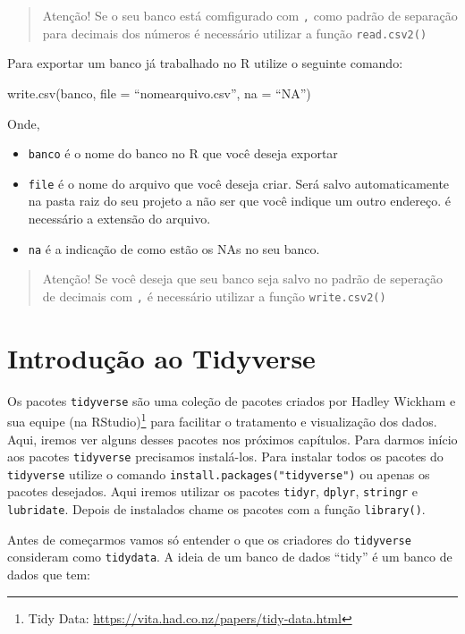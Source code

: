 \documentclass[]{book}
\providecommand{\tightlist}{%
  \setlength{\itemsep}{0pt}\setlength{\parskip}{0pt}}
\let\rmarkdownfootnote\footnote%
\def\footnote{\protect\rmarkdownfootnote}
\theoremstyle{definition}
\theoremstyle{definition}
\theoremstyle{definition}
\theoremstyle{remark}
\begin{document}
\begin{quote}
Atenção! Se o seu banco está comfigurado com \texttt{,} como padrão de separação para decimais dos números é necessário utilizar a função \texttt{read.csv2()}
\end{quote}

Para exportar um banco já trabalhado no R utilize o seguinte comando:

write.csv(banco, file = ``nomearquivo.csv'', na = ``NA'')

Onde,

\begin{itemize}
\tightlist
\item
  \texttt{banco} é o nome do banco no R que você deseja exportar
\item
  \texttt{file} é o nome do arquivo que você deseja criar. Será salvo automaticamente na pasta raiz do seu projeto a não ser que você indique um outro endereço. é necessário a extensão do arquivo.
\item
  \texttt{na} é a indicação de como estão os NAs no seu banco.
\end{itemize}

\begin{quote}
Atenção! Se você deseja que seu banco seja salvo no padrão de seperação de decimais com \texttt{,} é necessário utilizar a função \texttt{write.csv2()}
\end{quote}

\hypertarget{tidy}{%
\chapter{Introdução ao Tidyverse}\label{tidy}}

Os pacotes \texttt{tidyverse} são uma coleção de pacotes criados por Hadley Wickham e sua equipe (na RStudio)\footnote{Tidy Data: \url{https://vita.had.co.nz/papers/tidy-data.html}} para facilitar o tratamento e visualização dos dados. Aqui, iremos ver alguns desses pacotes nos próximos capítulos. Para darmos início aos pacotes \texttt{tidyverse} precisamos instalá-los. Para instalar todos os pacotes do \texttt{tidyverse} utilize o comando \texttt{install.packages("tidyverse")} ou apenas os pacotes desejados. Aqui iremos utilizar os pacotes \texttt{tidyr}, \texttt{dplyr}, \texttt{stringr} e \texttt{lubridate}. Depois de instalados chame os pacotes com a função \texttt{library()}.

Antes de começarmos vamos só entender o que os criadores do \texttt{tidyverse} consideram como \texttt{tidydata}. A ideia de um banco de dados ``tidy'' é um banco de dados que tem:
\end{document}
